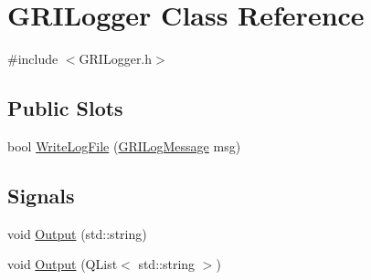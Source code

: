 \hypertarget{classGRILogger}{\section{\-G\-R\-I\-Logger \-Class \-Reference}
\label{classGRILogger}
}


{\ttfamily \#include $<$\-G\-R\-I\-Logger.\-h$>$}

\subsection*{\-Public \-Slots}
\begin{DoxyCompactItemize}
\item 
bool \hyperlink{classGRILogger_afde9ab6b9dc1700494ff8e9d7b7963db}{\-Write\-Log\-File} (\hyperlink{classGRILogMessage}{\-G\-R\-I\-Log\-Message} msg)
\end{DoxyCompactItemize}
\subsection*{\-Signals}
\begin{DoxyCompactItemize}
\item 
void \hyperlink{classGRILogger_af2288c2cabc18ebfa16bb6c154a7f0d2}{\-Output} (std\-::string)
\item 
void \hyperlink{classGRILogger_af576a217f0f98104b1c8d8cbe5154999}{\-Output} (\-Q\-List$<$ std\-::string $>$)
\end{DoxyCompactItemize}
